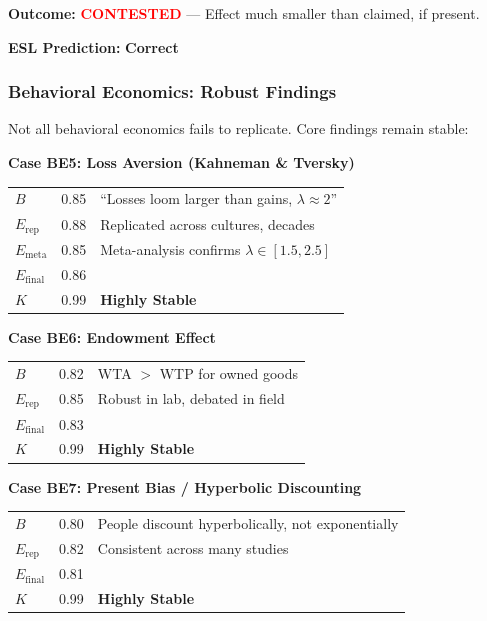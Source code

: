 \documentclass[11pt,a4paper]{article}
\begin{document}
\textbf{Outcome:} \textcolor{red}{\textbf{CONTESTED}} --- Effect much smaller than claimed, if present.

\textbf{ESL Prediction:} \checkmark \textbf{Correct}

\subsubsection{Behavioral Economics: Robust Findings}

Not all behavioral economics fails to replicate. Core findings remain stable:

\textbf{Case BE5: Loss Aversion (Kahneman \& Tversky)}

\begin{center}
\begin{tabular}{lcl}
\toprule
$B$ & 0.85 & ``Losses loom larger than gains, $\lambda \approx 2$'' \\
$E_{\text{rep}}$ & 0.88 & Replicated across cultures, decades \\
$E_{\text{meta}}$ & 0.85 & Meta-analysis confirms $\lambda \in [1.5, 2.5]$ \\
\midrule
$E_{\text{final}}$ & 0.86 & \\
$K$ & 0.99 & \textbf{Highly Stable} \\
\bottomrule
\end{tabular}
\end{center}

\textbf{Case BE6: Endowment Effect}

\begin{center}
\begin{tabular}{lcl}
\toprule
$B$ & 0.82 & WTA $>$ WTP for owned goods \\
$E_{\text{rep}}$ & 0.85 & Robust in lab, debated in field \\
\midrule
$E_{\text{final}}$ & 0.83 & \\
$K$ & 0.99 & \textbf{Highly Stable} \\
\bottomrule
\end{tabular}
\end{center}

\textbf{Case BE7: Present Bias / Hyperbolic Discounting}

\begin{center}
\begin{tabular}{lcl}
\toprule
$B$ & 0.80 & People discount hyperbolically, not exponentially \\
$E_{\text{rep}}$ & 0.82 & Consistent across many studies \\
\midrule
$E_{\text{final}}$ & 0.81 & \\
$K$ & 0.99 & \textbf{Highly Stable} \\
\bottomrule
\end{tabular}
\end{center}
\end{document}
